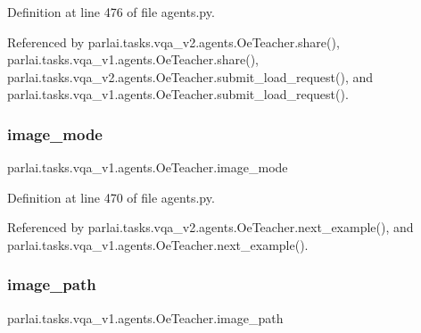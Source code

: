 Definition at line 476 of file agents.\+py.



Referenced by parlai.\+tasks.\+vqa\+\_\+v2.\+agents.\+Oe\+Teacher.\+share(), parlai.\+tasks.\+vqa\+\_\+v1.\+agents.\+Oe\+Teacher.\+share(), parlai.\+tasks.\+vqa\+\_\+v2.\+agents.\+Oe\+Teacher.\+submit\+\_\+load\+\_\+request(), and parlai.\+tasks.\+vqa\+\_\+v1.\+agents.\+Oe\+Teacher.\+submit\+\_\+load\+\_\+request().

\mbox{\label{classparlai_1_1tasks_1_1vqa__v1_1_1agents_1_1OeTeacher_ae600010b7db2aaf523db54fb0ef28906}} 
\subsubsection{\texorpdfstring{image\+\_\+mode}{image\_mode}}
{\footnotesize\ttfamily parlai.\+tasks.\+vqa\+\_\+v1.\+agents.\+Oe\+Teacher.\+image\+\_\+mode}



Definition at line 470 of file agents.\+py.



Referenced by parlai.\+tasks.\+vqa\+\_\+v2.\+agents.\+Oe\+Teacher.\+next\+\_\+example(), and parlai.\+tasks.\+vqa\+\_\+v1.\+agents.\+Oe\+Teacher.\+next\+\_\+example().

\mbox{\label{classparlai_1_1tasks_1_1vqa__v1_1_1agents_1_1OeTeacher_a93136db89c9b7943ff6aaeb28157d12e}} 
\subsubsection{\texorpdfstring{image\+\_\+path}{image\_path}}
{\footnotesize\ttfamily parlai.\+tasks.\+vqa\+\_\+v1.\+agents.\+Oe\+Teacher.\+image\+\_\+path}



